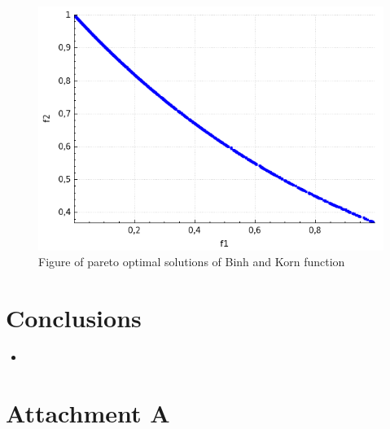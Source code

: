 \documentclass[a4paper, 11pt]{article}
\begin{document}
	\begin{figure}[H]
	\centering
	\includegraphics[scale=0.4]{ctp1}
	\caption{Figure of pareto optimal solutions of Binh and Korn function}
	\label{fig:ctp1}
	\end{figure}

	\newpage
	\section{Conclusions}
	
	\begin{itemize}
		\item
	\end{itemize}
	
	\newpage	
	\section*{Attachment A}
	
\end{document}

